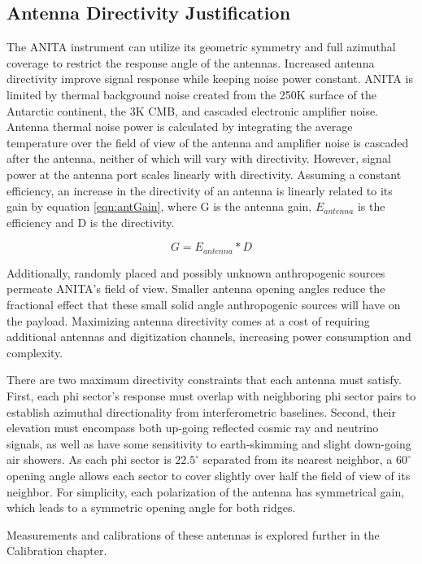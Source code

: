 	\subsection{Antenna Directivity Justification}
		The ANITA instrument can utilize its geometric symmetry and full azimuthal coverage to restrict the response angle of the antennas. Increased antenna directivity improve signal response while keeping noise power constant.  ANITA is limited by thermal background noise created from the 250K surface of the Antarctic continent, the 3K CMB, and cascaded electronic amplifier noise.  Antenna thermal noise power is calculated by integrating the average temperature over the field of view of the antenna and amplifier noise is cascaded after the antenna, neither of which will vary with directivity.  However, signal power at the antenna port scales linearly with directivity. Assuming a constant efficiency, an increase in the directivity of an antenna is linearly related to its gain by equation \ref{eqn:antGain}, where G is the antenna gain, $E_{antenna}$ is the efficiency and D is the directivity.
		
\begin{equation}
	\label{eqn:antGain}
	G = E_{antenna} * D
\end{equation}

		
		 Additionally, randomly placed and possibly unknown anthropogenic sources permeate ANITA's field of view.  Smaller antenna opening angles reduce the fractional effect that these small solid angle anthropogenic sources will have on the payload.  Maximizing antenna directivity comes at a cost of requiring additional antennas and digitization channels, increasing power consumption and complexity.
		
		There are two maximum directivity constraints that each antenna must satisfy.  First, each phi sector's response must overlap with neighboring phi sector pairs to establish azimuthal directionality from interferometric baselines. Second, their elevation must encompass both up-going reflected cosmic ray and neutrino signals, as well as have some sensitivity to earth-skimming and slight down-going air showers.  As each phi sector is $22.5^{\circ}$ separated from its nearest neighbor, a $60^{\circ}$ opening angle allows each sector to cover slightly over half the field of view of its neighbor.  For simplicity, each polarization of the antenna has symmetrical gain, which leads to a symmetric opening angle for both ridges.
		
	Measurements and calibrations of these antennas is explored further in the Calibration chapter.
	
